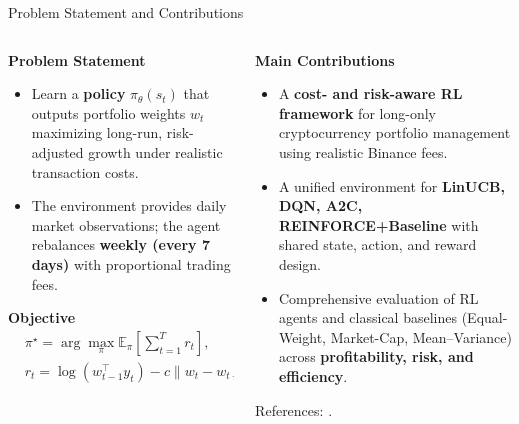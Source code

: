 \documentclass[aspectratio=169]{beamer}
\begin{document}
\begin{frame}{Problem Statement and Contributions}
\small

\begin{columns}[T,totalwidth=\textwidth]
  \begin{column}{0.52\textwidth}
    \textbf{Problem Statement}
    \begin{itemize}\setlength{\itemsep}{3pt}
      \item Learn a \textbf{policy} $\pi_\theta(s_t)$ that outputs portfolio weights $w_t$ maximizing long-run, risk-adjusted growth under realistic transaction costs.
      \item The environment provides daily market observations; the agent rebalances \textbf{weekly (every 7 days)} with proportional trading fees.
    \end{itemize}

    \textbf{Objective}
    {\footnotesize
    \begin{align*}
    &\pi^\star = \arg\max_\pi \mathbb{E}_\pi\!\left[\sum_{t=1}^T r_t \right],\\
    &r_t = \log(w_{t-1}^\top y_t) - c\|w_t - w_{t-1}\|_1.
    \end{align*}
    }
  \end{column}

  \begin{column}{0.48\textwidth}
    \textbf{Main Contributions}
    \begin{itemize}\setlength{\itemsep}{3pt}
      \item A \textbf{cost- and risk-aware RL framework} for long-only cryptocurrency portfolio management using realistic Binance fees.
      \item A unified environment for \textbf{LinUCB, DQN, A2C, REINFORCE+Baseline} with shared state, action, and reward design.
      \item Comprehensive evaluation of RL agents and classical baselines (Equal-Weight, Market-Cap, Mean–Variance) across \textbf{profitability, risk, and efficiency}.
    \end{itemize}

    \vspace{0.3em}
    \footnotesize References: \citep{jiang2017framework,betancourt2021dynamic,cui2023cvar}.
  \end{column}
\end{columns}

\end{frame}
\end{document}
